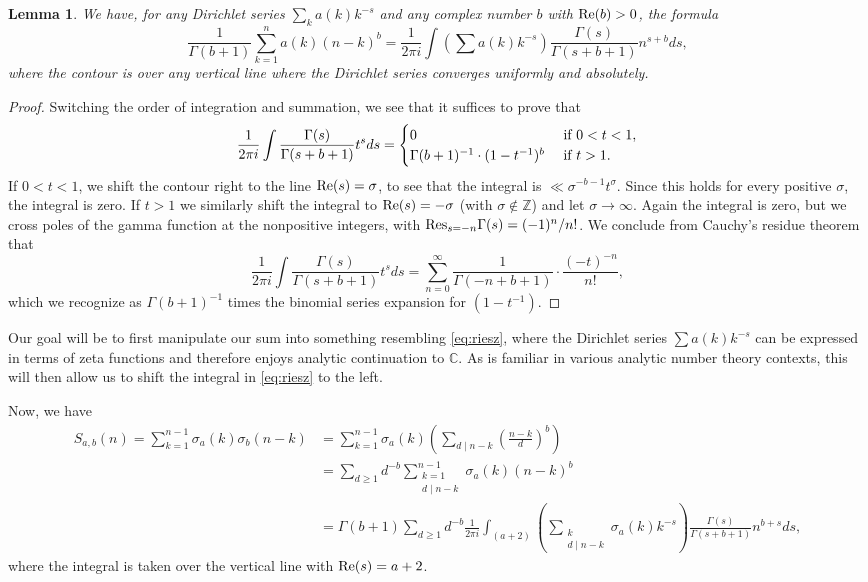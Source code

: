 \documentclass[12pt]{amsart}
\newtheorem{lemma}[theorem]{Lemma}
\numberwithin{equation}{section}
\numberwithin{theorem}{section}
\renewcommand\Re{\textnormal{Re}}
\newcommand\Res{\textnormal{Res}}
\begin{document}
\begin{lemma}
	We have, for any Dirichlet series $\sum_k a(k) k^{-s}$ and any complex number $b$ with $\Re(b) > 0$, the formula
	\begin{equation}\label{eq:riesz}
		\frac{1}{\Gamma(b + 1)} \sum_{k = 1}^n a(k) (n - k)^b = \frac{1}{2 \pi i} \int \left( \sum a(k) k^{-s} \right) \frac{\Gamma(s)}{\Gamma(s + b + 1)} n^{s + b} ds,
	\end{equation}
	where the contour is over any vertical line where the Dirichlet series converges uniformly and absolutely.
\end{lemma}

\begin{proof} 
	Switching the order of integration and summation, we see that it suffices to prove that
	\[
	 \frac{1}{2 \pi i} \int \frac{\Gamma(s)}{\Gamma(s + b + 1)} t^{s} ds =
	 \begin{cases} 0 & \textnormal{ if } 0 < t < 1, \\ \Gamma(b + 1)^{-1} \cdot (1 - t^{-1})^b  & \textnormal{ if }   t > 1.
	 \end{cases}
	 \]
	If $0 < t < 1$, we shift the contour right to the line $\Re(s) = \sigma$, to see that the integral is
	$\ll \sigma^{-b - 1} t^{\sigma}$. Since this holds for every positive $\sigma$, the integral is zero.
	If $t > 1$ we similarly shift the integral to $\Re(s) = -{\sigma}$ (with $\sigma \not \in \mathbb{Z}$) and let $\sigma \rightarrow \infty$.
	Again the integral is zero, but we cross poles of the gamma function at the nonpositive integers, 
	with $\Res_{s = -n} \Gamma(s) = (-1)^n/n!$. We 
	conclude from Cauchy's residue theorem that
	\[
	 \frac{1}{2 \pi i} \int \frac{\Gamma(s)}{\Gamma(s + b + 1)} t^{s} ds =
	  \sum_{n = 0}^{\infty} \frac{1}{\Gamma(-n + b + 1)} \cdot \frac{(-t)^{-n}}{n!},
	 \]
	 which we recognize as $\Gamma(b + 1)^{-1}$ times the binomial series expansion for $(1 - t^{-1})$.
\end{proof}


Our goal will be to first manipulate our sum into something resembling \eqref{eq:riesz},
where the Dirichlet series $\sum a(k) k^{-s}$ can be expressed in terms of zeta functions and therefore enjoys analytic continuation to $\mathbb{C}$. As is familiar
in various analytic number theory contexts, this will then allow us to shift the integral in \eqref{eq:riesz} to the left. 

Now, we have
\begin{align}
	S_{a, b}(n) = \nonumber  
	\sum_{k = 1}^{n - 1} \sigma_a(k) \sigma_b(n - k) & = 
	\sum_{k = 1}^{n - 1} \sigma_a(k) \left( \sum_{d \mid n - k} \left( \frac{n -k}{d} \right)^b \right) \\ \nonumber
	& = \sum_{d \geq 1} d^{-b} \sum_{\substack{k = 1 \\ d \mid n - k}}^{n - 1} \sigma_a(k) (n - k)^b \\
	& = \Gamma(b + 1)  \sum_{d \geq 1} d^{-b} \frac{1}{2 \pi i} \int_{(a + 2)} \left( \sum_{\substack{k \\ d \mid n - k}} \sigma_a(k) k^{-s} \right) 
	\frac{\Gamma(s)}{\Gamma(s + b + 1)} 
	n^{b + s} ds, \label{eq:sab_second}
\end{align}
\medskip
where the integral is taken over the vertical line with $\Re(s) = a + 2$.
\end{document}

